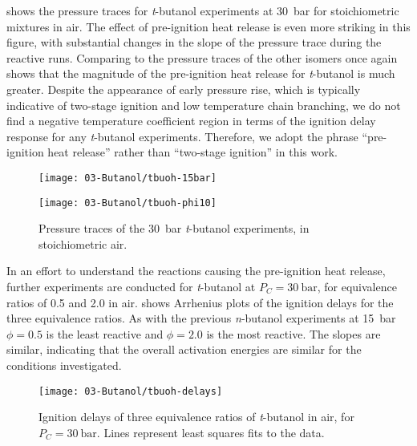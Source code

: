 \documentclass[12pt, letterpaper]{article}
\begin{document}
 shows the pressure traces for \textit{t}-butanol
experiments at \SI{30}{\bar} for stoichiometric mixtures in air. The effect of
pre-ignition heat release is even more striking in this figure, with
substantial changes in the slope of the pressure trace during the reactive
runs. Comparing to the pressure traces of the other isomers once again shows
that the magnitude of the pre-ignition heat release for \textit{t}-butanol is
much greater. Despite the appearance of early pressure rise, which is typically
indicative of two-stage ignition and low temperature chain branching, we do not
find a negative temperature coefficient region in terms of the ignition delay
response for any \textit{t}-butanol experiments. Therefore, we adopt the phrase
``pre-ignition heat release'' rather than ``two-stage ignition'' in this work.

\begin{figure}
    \begin{floatrow}
    \ffigbox
        {\texttt{[image: 03-Butanol/tbuoh-15bar]}}
        {\caption{Pressure traces of the \SI{15}{\bar} \textit{t}-butanol experiments,
            in stoichiometric air.}
        \label{fig:tbuoh-15bar}}
    \ffigbox
        {\texttt{[image: 03-Butanol/tbuoh-phi10]}}
        {\caption{Pressure traces of the \SI{30}{\bar} \textit{t}-butanol experiments,
            in stoichiometric air.}
        \label{fig:tbuoh-phi10}}
    \end{floatrow}
\end{figure}

In an effort to understand the reactions causing the pre-ignition heat release,
further experiments are conducted for \textit{t}-butanol at $P_C=\SI{30}{\bar}$, for
equivalence ratios of 0.5 and 2.0 in air.  shows
Arrhenius plots of the ignition delays for the three equivalence ratios. As
with the previous \textit{n}-butanol experiments at \SI{15}{\bar} \cite{Weber2011}
$\phi=\num{0.5}$ is the least reactive and $\phi=\num{2.0}$ is the most reactive. The
slopes are similar, indicating that the overall activation energies are similar
for the conditions investigated.

\begin{figure}
    \texttt{[image: 03-Butanol/tbuoh-delays]}
    \caption{Ignition delays of three equivalence ratios of \textit{t}-butanol
    in air, for $P_C=\SI{30}{\bar}$. Lines represent least squares fits to the data.}
    \label{fig:tbuoh-delays}
\end{figure}
\end{document}
